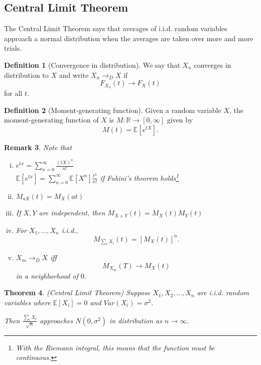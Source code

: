 \documentclass{tufte-handout}
\newcommand*\R{\mathbb{R}}
\newcommand*\E{\mathbb{E}}
\newtheorem{thm}{Theorem}[subsection]
\newtheorem{rmk}[thm]{Remark}
\theoremstyle{definition}
\newtheorem{defn}[thm]{Definition}
\begin{document}
\subsection{Central Limit Theorem}
The Central Limit Theorem says that averages of i.i.d. random variables approach a normal distribution when the averages are taken over more and more trials.

\begin{defn}[Convergence in distribution]
	We say that $X_n$ converges in distribution to $X$ and write $X_n \to_D X$ if \[
		F_{X_n}(t) \to F_X(t)
	\] for all $t$. 
\end{defn}

\begin{defn}[Moment-generating function]
	Given a random variable $X$, the moment-generating function of $X$ is $M: \R \to [0,\infty]$ given by \[
	M(t) = \E\left[e^{tX}\right]. \]
\end{defn}

\begin{rmk}
	Note that
	\begin{enumerate}[(i)]
		\item $e^{tx} = \sum\limits_{n=0}^{\infty} \frac{\left( tX \right)^n}{n!}$ \\
			$\E\left[e^{tx}\right] = \sum\limits_{n=0}^{\infty} \E\left[X^{n}\right] \frac{t^n}{n!}$ if Fubini's theorem holds\footnote{With the Riemann integral, this means that the function must be continuous.}
		\item $M_{aX}(t) = M_X(at)$
		\item If $X,Y$ are independent, then $M_{X+Y}(t) = M_X(t) M_Y(t)$
		\item For $X_1,\ldots,X_n$ i.i.d., \[
				M_{\sum_{i} X_i} (t) = \left[ M_X(t) \right] ^{n}
		.\] 
		\item $X_m \to_D X$ iff \[
			M_{X_m}(T) \to M_X(t)
		\] in a neighborhood of $0$.
	\end{enumerate}
\end{rmk}

\begin{thm}
	(Central Limit Theorem) Suppose $X_1,X_2,\ldots,X_n$ are i.i.d. random variables where $\E\left[X_i\right] = 0$ and $Var(X_i) = \sigma^2$. 

	Then $\frac{\sum_{i}^{} X_i}{\sqrt{n} }$ approaches $N(0,\sigma^2)$ in distribution as $n \to \infty$.
\end{thm}
\end{document}
